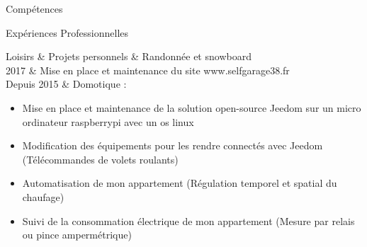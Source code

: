 


\begin{rubriquetableau}[\firstcolumnwidth]{Compétences}
	
	
\end{rubriquetableau}

\begin{rubriquetableau}[\firstcolumnwidth]{Expériences Professionnelles}
    
    
    
    \newpage
    
    
    
    
    
    
    
\end{rubriquetableau}


\newpage
\begin{rubriquetableau}[\firstcolumnwidth]{Loisirs \& Projets personnels}
			& Randonnée et snowboard \\
2017        & Mise en place et maintenance du site www.selfgarage38.fr \\
Depuis 2015 & Domotique :
			\begin{itemize}
				\item Mise en place et maintenance de la solution open-source Jeedom sur un micro ordinateur raspberrypi avec un os linux
				\item Modification des équipements pour les rendre connectés avec Jeedom (Télécommandes de volets roulants)
				\item Automatisation de mon appartement (Régulation temporel et spatial du chaufage)
				\item Suivi de la consommation électrique de mon appartement (Mesure par relais ou pince ampermétrique)
			\end{itemize}
\end{rubriquetableau}

